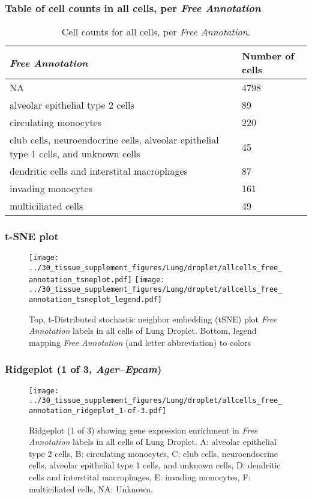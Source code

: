 \subsubsection{Table of cell counts in all cells, per \emph{Free Annotation}}\begin{table}[h]
\centering
\label{my-label}
\begin{tabular}{@{}ll@{}}
\toprule

\emph{Free Annotation}& Number of cells \\ \midrule
NA & 4798 \\

alveolar epithelial type 2 cells & 89 \\

circulating monocytes & 220 \\

club cells, neuroendocrine cells, alveolar epithelial type 1 cells, and unknown cells & 45 \\

dendritic cells and interstital macrophages & 87 \\

invading monocytes & 161 \\

multiciliated cells & 49 \\
\bottomrule
\end{tabular}
\caption{Cell counts for all cells, per \emph{Free Annotation}.}
\end{table}

\clearpage
\subsubsection{t-SNE plot}
\begin{figure}[h]
\centering
\texttt{[image: ../30\_tissue\_supplement\_figures/Lung/droplet/allcells\_free\_annotation\_tsneplot.pdf]}
\texttt{[image: ../30\_tissue\_supplement\_figures/Lung/droplet/allcells\_free\_annotation\_tsneplot\_legend.pdf]}
\caption{Top, t-Distributed stochastic neighbor embedding (tSNE) plot  \emph{Free Annotation} labels in all cells of Lung Droplet. Bottom, legend mapping \emph{Free Annotation} (and letter abbreviation) to colors}
\end{figure}


\clearpage

\subsubsection{Ridgeplot (1 of 3, \emph{Ager}--\emph{Epcam})}
\begin{figure}[h]
\centering
\texttt{[image: ../30\_tissue\_supplement\_figures/Lung/droplet/allcells\_free\_annotation\_ridgeplot\_1-of-3.pdf]}

\caption{ Ridgeplot (1 of 3)  showing gene expression enrichment in \emph{Free Annotation} labels in all cells of Lung Droplet. A: alveolar epithelial type 2 cells, B: circulating monocytes, C: club cells, neuroendocrine cells, alveolar epithelial type 1 cells, and unknown cells, D: dendritic cells and interstital macrophages, E: invading monocytes, F: multiciliated cells, NA: Unknown.}
\end{figure}


